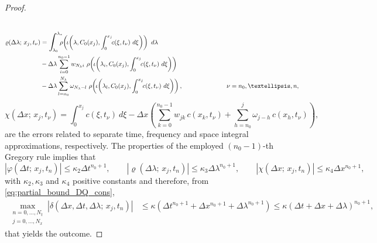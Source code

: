 \documentclass[10pt,a4paper]{amsart}
\begin{document}
\begin{proof}
\begin{equation*}
\begin{split}
\begin{array}{l}
        \end{array}
        \end{split}
    \end{equation*}
    \begin{equation*}
        \begin{split}
            \varrho(\Delta \lambda;  \, x_j, t_{\nu})&=\scalebox{1.3}{$\displaystyle\int$}_{\!\!\!\!\! \lambda_0}^{\lambda_*} \!\!\! \rho \! \left( \! \iota \! \left(\lambda, C_0(x_j) , \int_0^{x_j} \!\!   c(\xi,t_\nu)  \ d\xi \right) \right) \ d\lambda \\
            & - \Delta \lambda  \sum_{i=0}^{n_0-1} w_{N_\lambda i} \ \rho \! \left( \! \iota \! \left(\lambda_i, C_0(x_j) , \int_0^{x_j} \!\! c(\xi,t_\nu)  \ d\xi \right) \right) \\
            & - \Delta \lambda \sum_{l=n_0}^{N_\lambda} \omega_{N_\lambda-l} \ \rho \! \left( \! \iota \! \left(\lambda_l, C_0(x_j) , \int_0^{x_j} \!\! c(\xi,t_\nu)  \ d\xi \right) \right), 
            \qquad \qquad \qquad \quad \nu=n_0,\dots,n,
        \end{split}
    \end{equation*}
    \begin{equation*}
        \chi(\Delta x;  \, x_j, t_{\nu})=\int_0^{x_j} \!\!   c(\xi,t_\nu)  \ d\xi-\Delta x \left(\sum_{k=0}^{n_0-1}w_{jk} \, c(x_k,t_\nu)+ \sum_{h=n_0}^{j}\omega_{j-h} \, c(x_h,t_\nu)\right), \phantom{\qquad  \nu=n_0,\dots,n,}
    \end{equation*}
    are the errors related to separate time, frequency and space integral approximations, respectively. The properties of the employed $(n_0-1)$-th Gregory rule implies that
    \begin{equation*}
        |\varphi (\Delta t;  \, x_j, t_n)|\leq \kappa_2 \Delta t^{n_0+1}, \qquad |\varrho (\Delta \lambda;  \, x_j, t_n)|\leq \kappa_3 \Delta \lambda^{n_0+1}, \qquad |\chi (\Delta x;  \, x_j, t_n)|\leq \kappa_4 \Delta x^{n_0+1},
    \end{equation*}
    with $\kappa_2, \kappa_3$ and $\kappa_4$ positive constants and therefore, from \eqref{eq:partial_bound_DQ_cons},
    \begin{equation*}
        \begin{split}
             \max_{\substack{n=0,\dots, N_t \\ j=0,\dots, N_x}}|\delta(\Delta x, \Delta t, \Delta \lambda; \,  x_j,t_n)|&\leq \kappa \left(\Delta t^{n_0+1}+\Delta x^{n_0+1}+\Delta \lambda^{n_0+1}\right)\leq \kappa \left(\Delta t+\Delta x+\Delta \lambda\right)^{n_0+1},
        \end{split}
    \end{equation*}
    that yields the outcome.
\end{proof}
\end{document}

